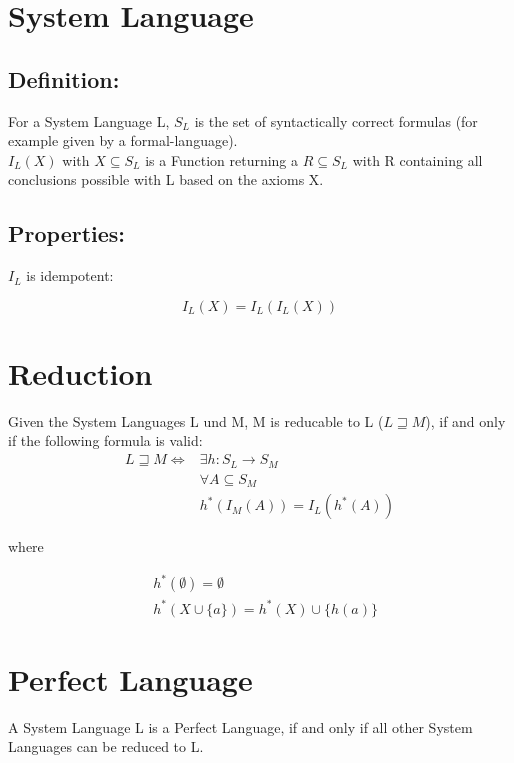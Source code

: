 \documentclass[11pt]{article}
\begin{document}
\section{System Language}
\subsection{Definition:}

For a System Language L, $S_L$ is the set of syntactically correct formulas (for example given by a formal-language).\\
$I_L(X)$ with $X \subseteq S_L$ is a Function returning a $R \subseteq S_L$ with R containing all conclusions possible with L based on the axioms X.

\subsection{Properties:}

$I_L$ is idempotent:

\[ I_L(X) = I_L(I_L(X)) \]

\section{Reduction}

Given the System Languages L und M, M is reducable to L ($L \sqsupseteq M$), if and only if the following formula is valid:
\begin{align*}
L \sqsupseteq M \iff &\exists h: S_L \rightarrow S_M \\
&\forall A \subseteq S_M \\
&h^*(I_M(A)) = I_L(h^*(A))
\end{align*}

where

\begin{align*}
&h^*(\emptyset) = \emptyset \\
&h^*(X \cup \{a\}) = h^*(X) \cup \{h(a)\}
\end{align*}

\section{Perfect Language}
A System Language L is a Perfect Language, if and only if all other System Languages can be reduced to L.
\end{document}
